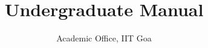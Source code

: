 \documentclass[a4paper]{extarticle}
\title{Undergraduate Manual}
\author{Academic Office, IIT Goa}
\begin{document}
\begin{sloppypar}

\frontmatter




\tableofcontents

\pagebreak

\mainmatter










\end{sloppypar}
\end{document}
